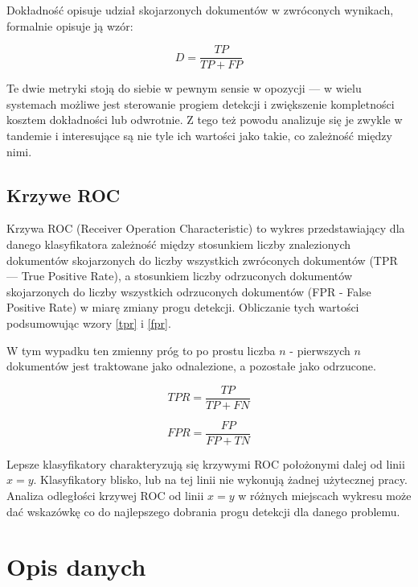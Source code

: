 \documentclass[11pt,a4paper]{article}
\begin{document}
Dokładność opisuje udział skojarzonych dokumentów w zwróconych wynikach, formalnie
opisuje ją wzór:

\begin{equation}
  D = \frac{TP}{TP + FP}
\end{equation}

Te dwie metryki stoją do siebie w pewnym sensie w opozycji --- w wielu
systemach możliwe jest sterowanie progiem detekcji i zwiększenie kompletności
kosztem dokładności lub odwrotnie. Z tego też powodu analizuje się je zwykle w
tandemie i interesujące są nie tyle ich wartości jako takie, co zależność
między nimi.

\subsection{Krzywe ROC}

Krzywa ROC \cite{roc-article1} (Receiver Operation Characteristic) to wykres
przedstawiający dla danego klasyfikatora zależność między stosunkiem liczby
znalezionych dokumentów skojarzonych do liczby wszystkich zwróconych dokumentów
(TPR --- True Positive Rate), a stosunkiem liczby odrzuconych dokumentów
skojarzonych do liczby wszystkich odrzuconych dokumentów (FPR - False Positive
Rate) w miarę zmiany progu detekcji. Obliczanie tych wartości podsumowując
wzory \ref{tpr} i \ref{fpr}.

W tym wypadku ten zmienny próg to po prostu liczba $n$ - pierwszych $n$
dokumentów jest traktowane jako odnalezione, a pozostałe jako odrzucone.

\begin{equation}
\label{tpr}
TPR = \frac{TP}{TP + FN}
\end{equation}

\begin{equation}
\label{fpr}
FPR = \frac{FP}{FP + TN}
\end{equation}

Lepsze klasyfikatory charakteryzują się krzywymi ROC położonymi dalej od linii
$x = y$.  Klasyfikatory blisko, lub na tej linii nie wykonują żadnej użytecznej
pracy. Analiza odległości krzywej ROC od linii $x = y$ w różnych miejscach
wykresu może dać wskazówkę co do najlepszego dobrania progu detekcji dla danego
problemu.

\pagebreak

\section{Opis danych}
\label{sec:data}
\label{data-description}
\end{document}
